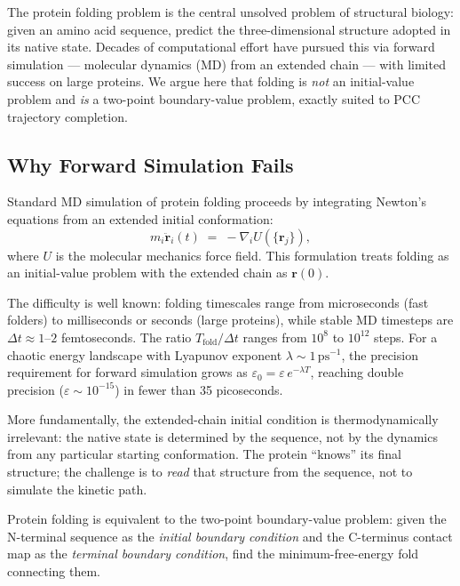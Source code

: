 The protein folding problem is the central unsolved problem of structural
biology: given an amino acid sequence, predict the three-dimensional
structure adopted in its native state.  Decades of computational effort
have pursued this via forward simulation --- molecular dynamics (MD) from
an extended chain --- with limited success on large proteins.  We argue
here that folding is \emph{not} an initial-value problem and \emph{is}
a two-point boundary-value problem, exactly suited to PCC trajectory
completion.

\subsection{Why Forward Simulation Fails}

Standard MD simulation of protein folding proceeds by integrating Newton's
equations from an extended initial conformation:
\begin{equation}
\label{eq:ch05-md}
    m_i \ddot{\mathbf{r}}_i(t) \;=\; -\nabla_i U(\{\mathbf{r}_j\}),
\end{equation}
where $U$ is the molecular mechanics force field.  This formulation treats
folding as an initial-value problem with the extended chain as $\mathbf{r}(0)$.

The difficulty is well known: folding timescales range from microseconds
(fast folders) to milliseconds or seconds (large proteins), while stable
MD timesteps are $\Delta t \approx 1$--$2$ femtoseconds.  The ratio
$T_{\mathrm{fold}} / \Delta t$ ranges from $10^8$ to $10^{12}$ steps.
For a chaotic energy landscape with Lyapunov exponent $\lambda \sim
1\,\mathrm{ps}^{-1}$, the precision requirement for forward simulation
grows as $\varepsilon_0 = \varepsilon\,e^{-\lambda T}$, reaching double
precision ($\varepsilon \sim 10^{-15}$) in fewer than 35 picoseconds.

More fundamentally, the extended-chain initial condition is thermodynamically
irrelevant: the native state is determined by the sequence, not by the
dynamics from any particular starting conformation.  The protein ``knows''
its final structure; the challenge is to \emph{read} that structure from
the sequence, not to simulate the kinetic path.

\begin{proposition}
\label{prop:ch05-folding-bvp}
Protein folding is equivalent to the two-point boundary-value problem:
given the N-terminal sequence as the \emph{initial boundary condition} and
the C-terminus contact map as the \emph{terminal boundary condition}, find
the minimum-free-energy fold connecting them.
\end{proposition}

